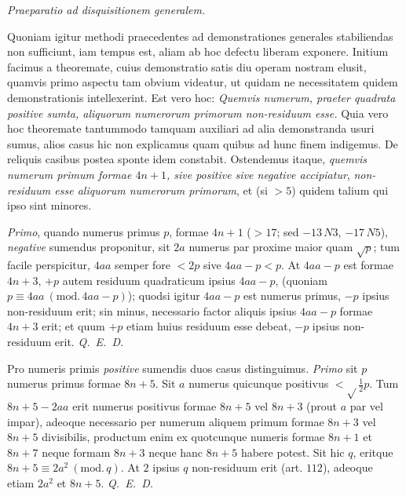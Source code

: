 \begin{center}\textit{Praeparatio ad disquisitionem generalem.}\end{center}


Quoniam igitur methodi praecedentes ad demonstrationes generales stabiliendas non sufficiunt, iam tempus est, aliam ab hoc defectu liberam exponere. Initium facimus a theoremate, cuius demonstratio satis diu operam nostram elusit, quamvis primo aspectu tam obvium videatur, ut quidam ne necessitatem quidem demonstrationis intellexerint. Est vero hoc: \textit{Quemvis numerum, praeter quadrata positive sumta, aliquorum numerorum primorum non-residuum esse.} Quia vero hoc theoremate tantummodo tamquam auxiliari ad alia demonstranda usuri sumus, alios casus hic non explicamus quam quibus ad hunc finem indigemus. De reliquis casibus postea sponte idem constabit. Ostendemus itaque, \textit{quemvis numerum primum formae $4n+1$, sive positive sive negative accipiatur}, \textit{non-residuum esse aliquorum numerorum primorum}, et (si $>5$) quidem talium qui ipso sint minores.

\textit{Primo}, quando numerus primus $p$, formae $4n+1$ ($>17$; sed $-13\,N3$, $-17\,N5$), \textit{negative} sumendus proponitur, sit $2a$ numerus par proxime maior quam $\surd p$; tum facile perspicitur, $4aa$ semper fore $<2p$ sive $4aa-p<p$. At $4aa-p$ est formae $4n+3$, $+p$ autem residuum quadraticum ipsius $4aa-p$, (quoniam $p\equiv4aa\ (\mathrm{mod.}\,4aa-p)$); quodsi igitur $4aa-p$ est numerus primus, $-p$ ipsius non-residuum erit; sin minus, necessario factor aliquis ipsius $4aa-p$ formae $4n+3$ erit; et quum $+p$ etiam huius residuum esse debeat, $-p$ ipsius non-residuum erit. \textit{Q.\ E.\ D.}

Pro numeris primis \textit{positive} sumendis duos casus distinguimus. \textit{Primo} sit $p$ numerus primus formae $8n+5$. Sit $a$ numerus quicunque positivus $<\surd\!\frac12 p$. Tum $8n+5-2aa$ erit numerus positivus formae $8n+5$ vel $8n+3$ (prout $a$ par vel impar), adeoque necessario per numerum aliquem primum formae $8n+3$ vel $8n+5$ divisibilis, productum enim ex quotcunque numeris formae $8n+1$ et $8n+7$ neque formam $8n+3$ neque hanc $8n+5$ habere potest. Sit hic $q$, eritque $8n+5\equiv2a^2\ (\mathrm{mod.}\,q)$. At $2$ ipsius $q$ non-residuum erit (art. $112$), adeoque etiam $2a^2$ et $8n+5$. \textit{Q.\ E.\ D.}

